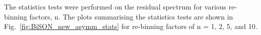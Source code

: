 The statistics tests were performed on the residual spectrum for various re-binning factors, n. The plots summarising the statistics tests are shown in Fig.~\ref{fig:BiSON_new_asymm_stats} for re-binning factors of n = 1, 2, 5, and 10.

\begin{figure}[!ht]
	\centering
	\qquad
	 \\
	
	\qquad
	

\end{figure}
